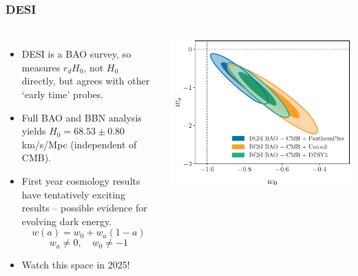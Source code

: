 \documentclass[aspectratio=169]{beamer}
\begin{document}
\begin{frame}
    \frametitle{DESI}
    \begin{columns}
        \begin{itemize}
            \item DESI is a BAO survey, so measures $r_d H_0$, not $H_0$ directly, but agrees with other `early time' probes.
            \item Full BAO and BBN analysis yields $H_0 = 68.53 \pm 0.80$ km/s/Mpc (independent of CMB). \hfill {}
            \item First year cosmology results have tentatively exciting results -- possible evidence for evolving dark energy. \hfill {}
                \[ w(a) = w_0 + w_a(1-a) \]
                \[ w_a \ne 0, \quad w_0 \ne -1 \]
            \item Watch this space in 2025!
        \end{itemize}
        \includegraphics[width=\textwidth]{figures/w0wa_DESI-Planck-SN-95lim.pdf}
    \end{columns}
\end{frame}
\end{document}

